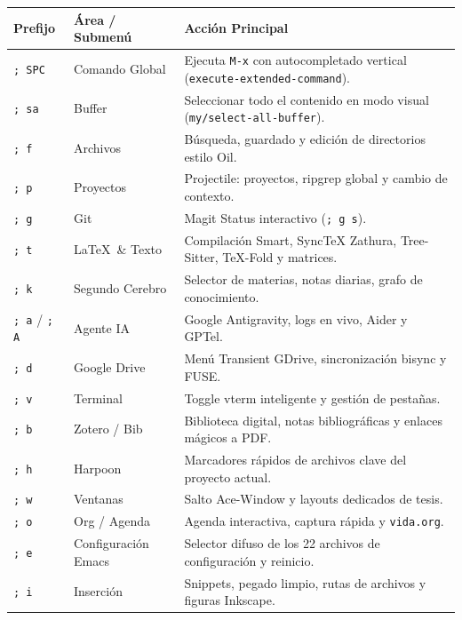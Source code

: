 \documentclass[11pt,book,spanish,alphabetic]{apuntes-scr}
\begin{document}
\begin{center}
\small
\begin{tabularx}{\linewidth}{p{2.2cm} p{3.5cm} X}
\toprule
\textbf{Prefijo} & \textbf{Área / Submenú} & \textbf{Acción Principal} \\
\midrule
\texttt{; SPC} & Comando Global & Ejecuta \texttt{M-x} con autocompletado vertical (\texttt{execute-extended-command}). \\
\texttt{; sa}  & Buffer & Seleccionar todo el contenido en modo visual (\texttt{my/select-all-buffer}). \\
\texttt{; f}   & Archivos & Búsqueda, guardado y edición de directorios estilo Oil. \\
\texttt{; p}   & Proyectos & Projectile: proyectos, ripgrep global y cambio de contexto. \\
\texttt{; g}   & Git & Magit Status interactivo (\texttt{; g s}). \\
\texttt{; t}   & \LaTeX\ \& Texto & Compilación Smart, SyncTeX Zathura, Tree-Sitter, TeX-Fold y matrices. \\
\texttt{; k}   & Segundo Cerebro & Selector de materias, notas diarias, grafo de conocimiento. \\
\texttt{; a} / \texttt{; A} & Agente IA & Google Antigravity, logs en vivo, Aider y GPTel. \\
\texttt{; d}   & Google Drive & Menú Transient GDrive, sincronización bisync y FUSE. \\
\texttt{; v}   & Terminal & Toggle vterm inteligente y gestión de pestañas. \\
\texttt{; b}   & Zotero / Bib & Biblioteca digital, notas bibliográficas y enlaces mágicos a PDF. \\
\texttt{; h}   & Harpoon & Marcadores rápidos de archivos clave del proyecto actual. \\
\texttt{; w}   & Ventanas & Salto Ace-Window y layouts dedicados de tesis. \\
\texttt{; o}   & Org / Agenda & Agenda interactiva, captura rápida y \texttt{vida.org}. \\
\texttt{; e}   & Configuración Emacs & Selector difuso de los 22 archivos de configuración y reinicio. \\
\texttt{; i}   & Inserción & Snippets, pegado limpio, rutas de archivos y figuras Inkscape. \\
\bottomrule
\end{tabularx}
\end{center}
\end{document}

